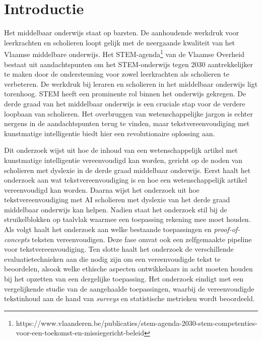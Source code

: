 
\section{Introductie}%
\label{sec:introductie}


Het middelbaar onderwijs staat op barsten. De aanhoudende werkdruk voor leerkrachten en scholieren loopt gelijk met de neergaande kwaliteit van het Vlaamse middelbare onderwijs. Het STEM-agenda\footnote{https://www.vlaanderen.be/publicaties/stem-agenda-2030-stem-competenties-voor-een-toekomst-en-missiegericht-beleid} van de Vlaamse Overheid bestaat uit aandachtspunten om het STEM-onderwijs tegen 2030 aantrekkelijker te maken door de ondersteuning voor zowel leerkrachten als scholieren te verbeteren. De werkdruk bij leraren en scholieren in het middelbaar onderwijs ligt torenhoog. STEM heeft een prominente rol binnen het onderwijs gekregen. De derde graad van het middelbaar onderwijs is een cruciale stap voor de verdere loopbaan van scholieren. Het overbruggen van wetenschappelijke jargon is echter nergens in de aandachtspunten terug te vinden, maar tekstvereenvoudiging met kunstmatige intelligentie biedt hier een revolutionaire oplossing aan.

Dit onderzoek wijst uit hoe de inhoud van een wetenschappelijk artikel met kunstmatige intelligentie vereenvoudigd kan worden, gericht op de noden van scholieren met dyslexie in de derde graad middelbaar onderwijs. Eerst haalt het onderzoek aan wat tekstvereenvoudiging is en hoe een wetenschappelijk artikel vereenvoudigd kan worden. Daarna wijst het onderzoek uit hoe tekstvereenvoudiging met AI scholieren met dyslexie van het derde graad middelbaar onderwijs kan helpen. Nadien staat het onderzoek stil bij de struikelblokken op taalvlak waarmee een toepassing rekening mee moet houden. Als volgt haalt het onderzoek aan welke bestaande toepassingen en \textit{proof-of-concepts} teksten vereenvoudigen. Deze fase omvat ook een zelfgemaakte pipeline voor tekstvereenvoudiging. Ten slotte haalt het onderzoek de verschillende evaluatietechnieken aan die nodig zijn om een vereenvoudigde tekst te beoordelen, alsook welke ethische aspecten ontwikkelaars in acht moeten houden bij het opzetten van een dergelijke toepassing. Het onderzoek eindigt met een vergelijkende studie van de aangehaalde toepassingen, waarbij de vereenvoudigde tekstinhoud aan de hand van \textit{surveys} en statistische metrieken wordt beoordeeld.

